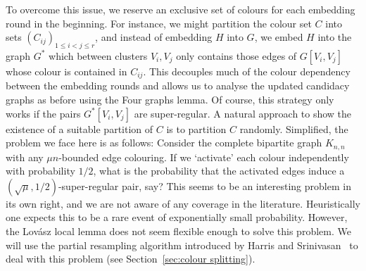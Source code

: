 \documentclass[10pt]{amsart}
\theoremstyle{definition}
\theoremstyle{claimstyle}
\theoremstyle{stepstyle}
\numberwithin{equation}{section}
\begin{document}
To overcome this issue, we reserve an exclusive set of colours for each embedding round in the beginning. For instance, we might partition the colour set $C$ into sets $(C_{ij})_{1\le i<j\le r}$, and instead of embedding $H$ into $G$, we embed $H$ into the graph $G^\ast$ which between clusters $V_i,V_j$ only contains those edges of $G[V_i,V_j]$ whose colour is contained in $C_{ij}$. This decouples much of the colour dependency between the embedding rounds and allows us to analyse the updated candidacy graphs as before using the Four graphs lemma.
Of course, this strategy only works if the pairs $G^\ast[V_i,V_j]$ are super-regular. A natural approach to show the existence of a suitable partition of $C$ is to partition $C$ randomly. Simplified, the problem we face here is as follows: Consider the complete bipartite graph $K_{n,n}$ with any $\mu n$-bounded edge colouring. If we `activate' each colour independently with probability $1/2$, what is the probability that the activated edges induce a $(\sqrt{\mu},1/2)$-super-regular pair, say?
This seems to be an interesting problem in its own right, and we are not aware of any coverage in the literature. Heuristically one expects this to be a rare event of exponentially small probability. However, the Lov\'asz local lemma does not seem flexible enough to solve this problem.
We will use the partial resampling algorithm introduced by Harris and Srinivasan~\cite{HS:18} to deal with this problem (see Section~\ref{sec:colour splitting}).
\end{document}
